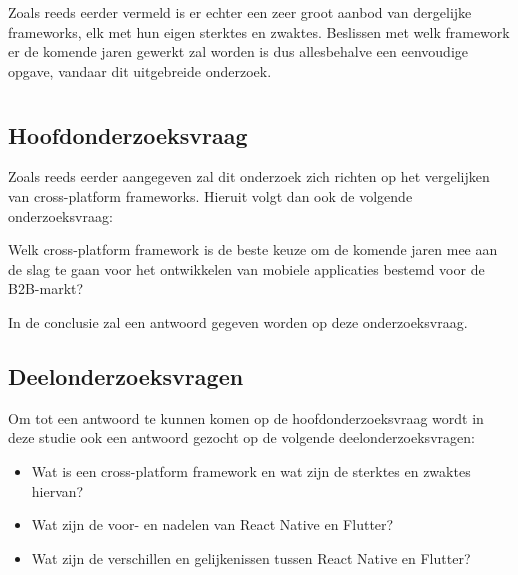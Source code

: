 Zoals reeds eerder vermeld is er echter een zeer groot aanbod van dergelijke frameworks, elk met hun eigen sterktes en zwaktes. Beslissen met welk framework er de komende jaren gewerkt zal worden is dus allesbehalve een eenvoudige opgave, vandaar dit uitgebreide onderzoek.

\section{}
\label{sec:onderzoeksvraag}


\subsection{Hoofdonderzoeksvraag}

Zoals reeds eerder aangegeven zal dit onderzoek zich richten op het vergelijken van cross-platform frameworks. Hieruit volgt dan ook de volgende onderzoeksvraag:

Welk cross-platform framework is de beste keuze om de komende jaren mee aan de slag te gaan voor het ontwikkelen van mobiele applicaties bestemd voor de B2B-markt?

In de conclusie zal een antwoord gegeven worden op deze onderzoeksvraag.

\subsection{Deelonderzoeksvragen}

Om tot een antwoord te kunnen komen op de hoofdonderzoeksvraag wordt in deze studie ook een antwoord gezocht op de volgende deelonderzoeksvragen:

\begin{itemize}
    \item Wat is een cross-platform framework en wat zijn de sterktes en zwaktes hiervan?
    \item Wat zijn de voor- en nadelen van React Native en Flutter?
    \item Wat zijn de verschillen en gelijkenissen tussen React Native en Flutter?
\end{itemize}

